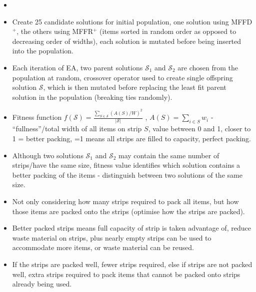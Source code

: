\documentclass{elsarticle}
\begin{document}
{\color{myRed}
	\begin{itemize}[leftmargin=*]
		\item
	\end{itemize}
}

\begin{itemize}
	\item Create 25 candidate solutions for initial population, one solution using MFFD$^+$, the others using MFFR$^+$ (items sorted in random order as opposed to decreasing order of widths), each solution is mutated before being inserted into the population.
	\item Each iteration of EA, two parent solutions $\mathcal{S}_1$ and $\mathcal{S}_2$ are chosen from the population at random, crossover operator used to create single offspring solution $\mathcal{S}$, which is then mutated before replacing the least fit parent solution in the population (breaking ties randomly).
	\item Fitness function $f(\mathcal{S}) = \frac{\sum_{S \in \mathcal{S}} (A(S)/W)^2}{|\mathcal{S}|}$ \cite{falkenauer1992}, $A(S) = \sum_{i \in S} w_i$ - ``fullness''/total width of all items on strip $S$, value between 0 and 1, closer to 1 = better packing, =1 means all strips are filled to capacity, perfect packing.
	\item Although two solutions $\mathcal{S}_1$ and $\mathcal{S}_2$ may contain the same number of strips/have the same size, fitness value identifies which solution contains a better packing of the items - distinguish between two solutions of the same size.
	\item Not only considering how many strips required to pack all items, but how those items are packed onto the strips (optimise how the strips are packed).
	\item Better packed strips means full capacity of strip is taken advantage of, reduce waste material on strips, plus nearly empty strips can be used to accommodate more items, or waste material can be reused.
	\item If the strips are packed well, fewer strips required, else if strips are not packed well, extra strips required to pack items that cannot be packed onto strips already being used.

\end{itemize}
\end{document}
